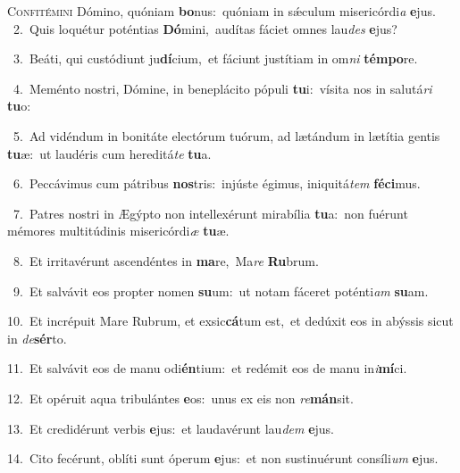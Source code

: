 \lettrine{\initial\textcolor{\initialcolor}{C}}{onfitémini} Dómino, quóniam \textbf{bo}\-nus:~\star quóniam in sǽculum misericórdi\textit{a} \textbf{e}\-jus.\\
{\numbfont\textcolor{\numbcolor}{~2.}}~Quis loquétur poténtias \textbf{Dó}\-mini,~\star audítas fáciet omnes lau\textit{des} \textbf{e}\-jus?\par
{\numbfont\textcolor{\numbcolor}{~3.}}~Beáti, qui custódiunt ju\-\textbf{dí}\-cium,~\star et fáciunt justítiam in om\textit{ni} \textbf{tém}\-\textbf{po}re.\par
{\numbfont\textcolor{\numbcolor}{~4.}}~Meménto nostri, Dómine, in beneplácito pópuli \textbf{tu}\-i:~\star vísita nos in salutá\textit{ri} \textbf{tu}\-o:\par
{\numbfont\textcolor{\numbcolor}{~5.}}~Ad vidéndum in bonitáte electórum tuórum, ad lætándum in lætítia gentis \textbf{tu}\-æ:~\star ut laudéris cum hereditá\textit{te} \textbf{tu}\-a.\par
{\numbfont\textcolor{\numbcolor}{~6.}}~Peccávimus cum pátribus \textbf{nos}\-tris:~\star injúste égimus, iniquitá\textit{tem} \textbf{fé}\-\textbf{ci}mus.\par
{\numbfont\textcolor{\numbcolor}{~7.}}~Patres nostri in Ægýpto non intellexérunt mirabília \textbf{tu}\-a:~\star non fuérunt mémores multitúdinis misericórdi\textit{æ} \textbf{tu}\-æ.\par
{\numbfont\textcolor{\numbcolor}{~8.}}~Et irritavérunt ascendéntes in \textbf{ma}\-re,~\star Ma\textit{re} \textbf{Ru}\-brum.\par
{\numbfont\textcolor{\numbcolor}{~9.}}~Et salvávit eos propter nomen \textbf{su}\-um:~\star ut notam fáceret poténti\textit{am} \textbf{su}\-am.\par
{\numbfont\textcolor{\numbcolor}{10.}}~Et incrépuit Mare Rubrum, et exsic\-\textbf{cá}\-tum est,~\star et dedúxit eos in abýssis sicut in \textit{de}\-\textbf{sér}to.\par
{\numbfont\textcolor{\numbcolor}{11.}}~Et salvávit eos de manu odi\-\textbf{én}\-tium:~\star et redémit eos de manu in\-\textit{i}\-\textbf{mí}ci.\par
{\numbfont\textcolor{\numbcolor}{12.}}~Et opéruit aqua tribulántes \textbf{e}\-os:~\star unus ex eis non \textit{re}\-\textbf{mán}sit.\par
{\numbfont\textcolor{\numbcolor}{13.}}~Et credidérunt verbis \textbf{e}\-jus:~\star et laudavérunt lau\textit{dem} \textbf{e}\-jus.\par
{\numbfont\textcolor{\numbcolor}{14.}}~Cito fecérunt, oblíti sunt óperum \textbf{e}\-jus:~\star et non sustinuérunt consíli\textit{um} \textbf{e}\-jus.\par
